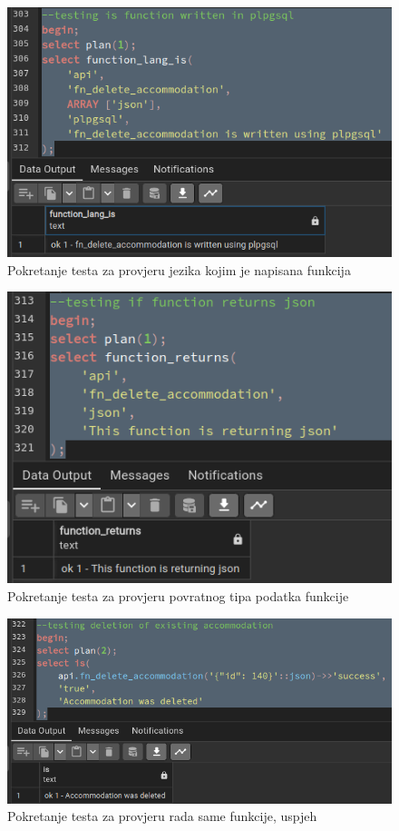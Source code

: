 				\begin{figure}[H]
					\centering
					\includegraphics[width=\textwidth]{slike/unit_tests/ut_5/func_lang.png}
					\caption{Pokretanje testa za provjeru jezika kojim je napisana funkcija}
					\label{fig: IS5-function_lang}
				\end{figure}
				\begin{figure}[H]
					\centering
					\includegraphics[width=\textwidth]{slike/unit_tests/ut_5/func_return.png}
					\caption{Pokretanje testa za provjeru povratnog tipa podatka funkcije}
					\label{fig: IS5-function_return}
				\end{figure}
				\begin{figure}[H]
					\centering
					\includegraphics[width=\textwidth]{slike/unit_tests/ut_5/success_invocation.png}
					\caption{Pokretanje testa za provjeru rada same funkcije, uspjeh}
					\label{fig: IS5-uspješno izbrisan smještaj}
				\end{figure}
